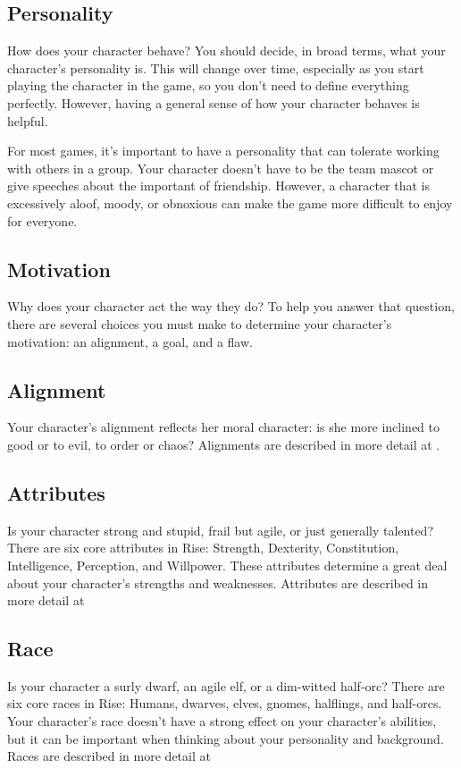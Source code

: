     \subsection{Personality}

        How does your character behave?
        You should decide, in broad terms, what your character's personality is.
        This will change over time, especially as you start playing the character in the game, so you don't need to define everything perfectly.
        However, having a general sense of how your character behaves is helpful.

        For most games, it's important to have a personality that can tolerate working with others in a group.
        Your character doesn't have to be the team mascot or give speeches about the important of friendship.
        However, a character that is excessively aloof, moody, or obnoxious can make the game more difficult to enjoy for everyone.

    \subsection{Motivation}

        Why does your character act the way they do?
        To help you answer that question, there are several choices you must make to determine your character's motivation: an alignment, a goal, and a flaw.

    \subsection{Alignment}

        Your character's alignment reflects her moral character: is she more inclined to good or to evil, to order or chaos?
        Alignments are described in more detail at .

    \subsection{Attributes}
        Is your character strong and stupid, frail but agile, or just generally talented?
        There are six core attributes in Rise: Strength, Dexterity, Constitution, Intelligence, Perception, and Willpower.
        These attributes determine a great deal about your character's strengths and weaknesses.
        Attributes are described in more detail at 

    \subsection{Race}
        Is your character a surly dwarf, an agile elf, or a dim-witted half-orc?
        There are six core races in Rise: Humans, dwarves, elves, gnomes, halflings, and half-orcs.
        Your character's race doesn't have a strong effect on your character's abilities, but it can be important when thinking about your personality and background.
        Races are described in more detail at 

